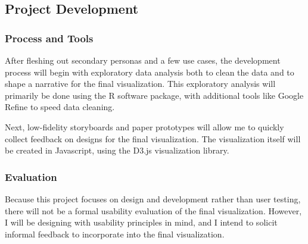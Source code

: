 \subsection{Project Development}\label{development}
\subsubsection{Process and Tools}
After fleshing out secondary personas and a few use cases, the development process will begin with exploratory data analysis both to clean the data and to shape a narrative for the final visualization. This exploratory analysis will primarily be done using the R software package, with additional tools like Google Refine to speed data cleaning.

Next, low-fidelity storyboards and paper prototypes will allow me to quickly collect feedback on designs for the final visualization. The visualization itself will be created in Javascript, using the D3.js visualization library.

\subsubsection{Evaluation}
Because this project focuses on design and development rather than user testing, there will not be a formal usability evaluation of the final visualization. However, I will be designing with usability principles in mind, and I intend to solicit informal feedback to incorporate into the final visualization.
